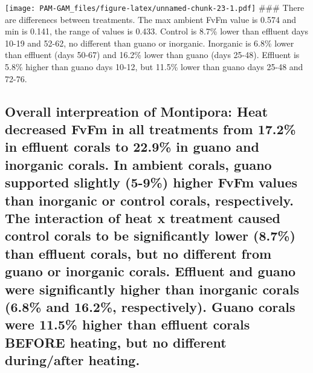 \documentclass[
]{article}
\newenvironment{Shaded}{\begin{snugshade}}{\end{snugshade}}
\newcommand{\AttributeTok}[1]{\textcolor[rgb]{0.13,0.29,0.53}{#1}}
\newcommand{\CommentTok}[1]{\textcolor[rgb]{0.56,0.35,0.01}{\textit{#1}}}
\newcommand{\DecValTok}[1]{\textcolor[rgb]{0.00,0.00,0.81}{#1}}
\newcommand{\FunctionTok}[1]{\textcolor[rgb]{0.13,0.29,0.53}{\textbf{#1}}}
\newcommand{\NormalTok}[1]{#1}
\newcommand{\SpecialCharTok}[1]{\textcolor[rgb]{0.81,0.36,0.00}{\textbf{#1}}}
\begin{document}
\begin{Shaded}
\end{Shaded}

\texttt{[image: PAM-GAM\_files/figure-latex/unnamed-chunk-23-1.pdf]}
\#\#\# There are differenecs between treatments. The max ambient FvFm
value is 0.574 and min is 0.141, the range of values is 0.433. Control
is 8.7\% lower than effluent days 10-19 and 52-62, no different than
guano or inorganic. Inorganic is 6.8\% lower than effluent (days 50-67)
and 16.2\% lower than guano (days 25-48). Effluent is 5.8\% higher than
guano days 10-12, but 11.5\% lower than guano days 25-48 and 72-76.

\hypertarget{overall-interpreation-of-montipora-heat-decreased-fvfm-in-all-treatments-from-17.2-in-effluent-corals-to-22.9-in-guano-and-inorganic-corals.-in-ambient-corals-guano-supported-slightly-5-9-higher-fvfm-values-than-inorganic-or-control-corals-respectively.-the-interaction-of-heat-x-treatment-caused-control-corals-to-be-significantly-lower-8.7-than-effluent-corals-but-no-different-from-guano-or-inorganic-corals.-effluent-and-guano-were-significantly-higher-than-inorganic-corals-6.8-and-16.2-respectively.-guano-corals-were-11.5-higher-than-effluent-corals-before-heating-but-no-different-duringafter-heating.}{%
\subsection{Overall interpreation of Montipora: Heat decreased FvFm in
all treatments from 17.2\% in effluent corals to 22.9\% in guano and
inorganic corals. In ambient corals, guano supported slightly (5-9\%)
higher FvFm values than inorganic or control corals, respectively. The
interaction of heat x treatment caused control corals to be
significantly lower (8.7\%) than effluent corals, but no different from
guano or inorganic corals. Effluent and guano were significantly higher
than inorganic corals (6.8\% and 16.2\%, respectively). Guano corals
were 11.5\% higher than effluent corals BEFORE heating, but no different
during/after
heating.}\label{overall-interpreation-of-montipora-heat-decreased-fvfm-in-all-treatments-from-17.2-in-effluent-corals-to-22.9-in-guano-and-inorganic-corals.-in-ambient-corals-guano-supported-slightly-5-9-higher-fvfm-values-than-inorganic-or-control-corals-respectively.-the-interaction-of-heat-x-treatment-caused-control-corals-to-be-significantly-lower-8.7-than-effluent-corals-but-no-different-from-guano-or-inorganic-corals.-effluent-and-guano-were-significantly-higher-than-inorganic-corals-6.8-and-16.2-respectively.-guano-corals-were-11.5-higher-than-effluent-corals-before-heating-but-no-different-duringafter-heating.}}
\end{document}
